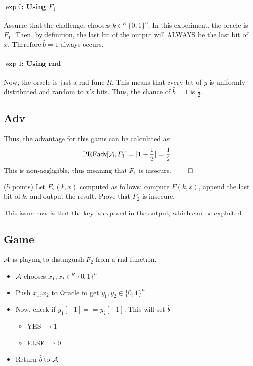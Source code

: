 \documentclass[12pt]{article}
\theoremstyle{plain}
\theoremstyle{definition}
\begin{document}
\begin{problem}
\begin{solution}
\paragraph{$\exp 0$: Using $F_1$}
Assume that the challenger chooses $k \in^R \{0, 1\}^n$. In this experiment, the oracle is $F_1$. Then, by definition, the last bit of the output will ALWAYS be the last bit of $x$. Therefore $\hat{b} = 1$ always occurs.

\paragraph{$\exp 1$: Using rnd}
Now, the oracle is just a rnd func $R$. This means that every bit of $y$ is uniformly distributed and random to $x$'s bits. Thus, the chance of $\hat{b} = 1$ is $\frac{1}{2}$.

\subsection*{Adv}
Thus, the advantage for this game can be calculated as:
\begin{equation*}
  \textrm{PRF}\textsf{adv}[\mathcal{A}, F_1] = |1 - \frac{1}{2}| = \frac{1}{2}
\end{equation*}
This is non-negligible, thus meaning that $F_1$ is insecure. $\qed$
\end{solution}

\begin{ppart} (5 points)
Let $F_2(k,x)$ computed as follows: compute $F(k, x)$, append the last bit of $k$, and output the result. Prove that $F_2$ is insecure.
\end{ppart}

\begin{solution}
This issue now is that the key is exposed in the output, which can be exploited.

\subsection*{Game}
$\mathcal{A}$ is playing to distinguish $F_2$ from a rnd function.
\begin{itemize}
  \item $\mathcal{A}$ chooses $x_1, x_2 \in^R \{0, 1\}^n$
  \item Push $x_1, x_2$ to $\text{Oracle}$ to get $y_1, y_2 \in \{0, 1\}^n$
  \item Now, check if $y_1[-1] == y_2[-1]$. This will set $\hat{b}$
  \begin{itemize}
    \item YES $\to 1$
    \item ELSE $\to 0$
  \end{itemize}
  \item Return $\hat{b}$ to $\mathcal{A}$
\end{itemize}


\end{solution}
\end{problem}
\end{document}
